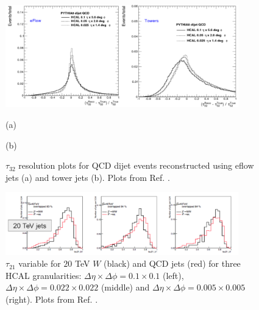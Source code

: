 \begin{figure}
	\centering
	\includegraphics[width=0.9\textwidth]{./Figures/hcal_gran_tau32.png}
	\begin{minipage}[t]{0.45\textwidth}
		\caption*{(a)}
	\end{minipage}%
	\hfill
	\begin{minipage}[t]{0.45\textwidth}
		\caption*{(b)}
	\end{minipage}
	\caption{$\tau_{32}$ resolution plots for QCD dijet events reconstructed using eflow jets (a) and tower jets (b). Plots from Ref. \cite{FCCweek2015}.}
	\label{fig:hcal_gran_tau32}
\end{figure}

\begin{figure}
	\centering
	\includegraphics[width=0.9\textwidth]{./Figures/overlap.png}
	\caption{$\tau_{21}$ variable for $20$ TeV $W$ (black) and QCD jets (red) for three HCAL granularities: $\Delta\eta\times\Delta\phi=0.1\times 0.1$ (left), $\Delta\eta\times\Delta\phi=0.022\times 0.022$ (middle) and $\Delta\eta\times\Delta\phi=0.005\times 0.005$ (right). Plots from Ref. \cite{BOOST2017}.}
	\label{fig:overlap}
\end{figure}

%
%

